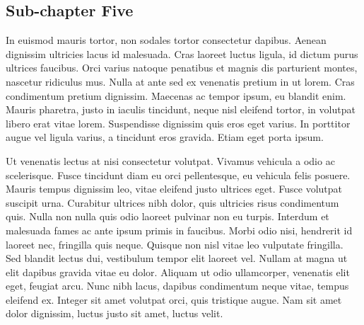 \begin{spacing}{1.5}
\newpage
\section{Sub-chapter Five}
In euismod mauris tortor, non sodales tortor consectetur dapibus. Aenean dignissim ultricies lacus id malesuada. Cras laoreet luctus ligula, id dictum purus ultrices faucibus. Orci varius natoque penatibus et magnis dis parturient montes, nascetur ridiculus mus. Nulla at ante sed ex venenatis pretium in ut lorem. Cras condimentum pretium dignissim. Maecenas ac tempor ipsum, eu blandit enim. Mauris pharetra, justo in iaculis tincidunt, neque nisl eleifend tortor, in volutpat libero erat vitae lorem. Suspendisse dignissim quis eros eget varius. In porttitor augue vel ligula varius, a tincidunt eros gravida. Etiam eget porta ipsum.

Ut venenatis lectus at nisi consectetur volutpat. Vivamus vehicula a odio ac scelerisque. Fusce tincidunt diam eu orci pellentesque, eu vehicula felis posuere. Mauris tempus dignissim leo, vitae eleifend justo ultrices eget. Fusce volutpat suscipit urna. Curabitur ultrices nibh dolor, quis ultricies risus condimentum quis. Nulla non nulla quis odio laoreet pulvinar non eu turpis. Interdum et malesuada fames ac ante ipsum primis in faucibus. Morbi odio nisi, hendrerit id laoreet nec, fringilla quis neque. Quisque non nisl vitae leo vulputate fringilla. Sed blandit lectus dui, vestibulum tempor elit laoreet vel. Nullam at magna ut elit dapibus gravida vitae eu dolor. Aliquam ut odio ullamcorper, venenatis elit eget, feugiat arcu. Nunc nibh lacus, dapibus condimentum neque vitae, tempus eleifend ex. Integer sit amet volutpat orci, quis tristique augue. Nam sit amet dolor dignissim, luctus justo sit amet, luctus velit.

\end{spacing}
\newpage


